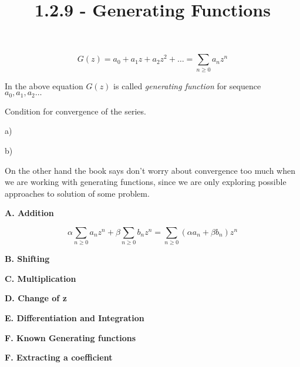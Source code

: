 \documentclass[12pt]{article}
\title{1.2.9 - Generating Functions}
\begin{document}
\maketitle

$$ G(z) = a_0 + a_1z + a_2z^2 + \ldots = \sum_{n\ge0}a_nz^n $$

In the above equation $G(z)$ is called {\it generating function} for sequence $a_0, a_1, a_2 \ldots $

Condition for convergence of the series.

a)

b)


On the other hand the book says don't worry about convergence too much when we are working with generating functions, since we are only exploring possible approaches to solution of some problem.

{\bf A. Addition }

$$ \alpha \sum_{n\ge0}a_nz^n + \beta \sum_{n\ge0}b_nz^n = \sum_{n\ge0}(\alpha a_n + \beta b_n)z^n $$


{\bf B. Shifting }

{\bf C. Multiplication }

{\bf D. Change of z }

{\bf E. Differentiation and Integration }

{\bf F. Known Generating functions }

{\bf F. Extracting a coefficient }
\end{document}
